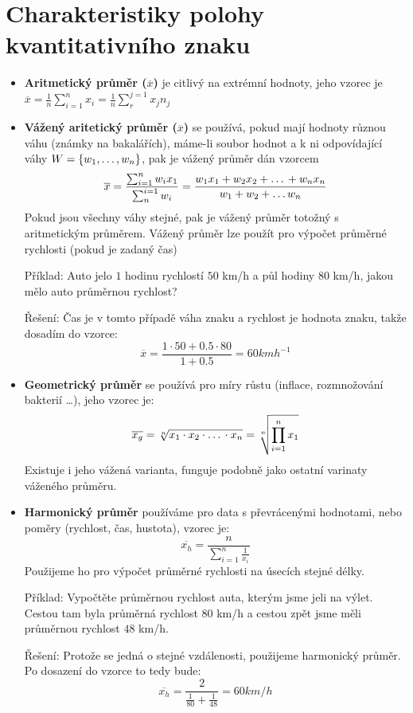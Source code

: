 \documentclass[12pt]{article}
\begin{document}
\section*{Charakteristiky polohy kvantitativního znaku}
\begin{itemize}[itemsep = 2pt]
    \item \textbf{Aritmetický průměr ($\overline{x}$)} je citlivý na extrémní hodnoty, jeho vzorec je \\
    $\overline{x} = \frac{1}{n} \sum_{i=1}^{n} x_i = \frac{1}{n} \sum_{r}^{j=1} x_j n_j$
    \item \textbf{Vážený aritetický průměr ($\overline{x}$)} se používá, pokud mají hodnoty různou váhu (známky na bakalářích), máme-li soubor hodnot a k ni odpovídající váhy $W = \{w_1, \text{\dots}, w_n\}$, pak je vážený průměr dán vzorcem \[\overline{x} = \frac{\sum_{i=1}^{n}w_i x_1}{\sum_{n}^{i = 1}w_i} = \frac{w_1 x_1 + w_2 x_2 +\text{\dots}+ w_n x_n}{w_1 + w_2 + \text{\dots} w_n}\]
    Pokud jsou všechny váhy stejné, pak je vážený průměr totožný s aritmetickým průměrem.
    Vážený průměr lze použít pro výpočet průměrné rychlosti (pokud je zadaný čas)

    Příklad: Auto jelo $1$ hodinu rychlostí $50$ km/h a půl hodiny $80$ km/h, jakou mělo auto průměrnou rychlost?

    Řešení: Čas je v tomto případě váha znaku a rychlost je hodnota znaku, takže dosadím do vzorce:
    \[\overline{x} = \frac{1\cdot 50 + 0.5 \cdot 80}{1 + 0.5} = 60 kmh^{-1}\]
    \item \textbf{Geometrický průměr} se používá pro míry růstu (inflace, rozmnožování bakterií \dots), jeho vzorec je: 
    \[\overline{x_g} = \sqrt[n]{x_1 \cdot x_2 \cdot \text{\dots} \cdot x_n} = \sqrt[n]{\prod_{i=1}^{n}x_1}\]
    Existuje i jeho vážená varianta, funguje podobně jako ostatní varinaty váženého průměru.
    \item \textbf{Harmonický průměr} používáme pro data s převrácenými hodnotami, nebo poměry (rychlost, čas, hustota), vzorec je:
    \[\overline{x_h} = \frac{n}{\sum_{i=1}^{n}\frac{1}{x_i}}\]
    Použijeme ho pro výpočet průměrné rychlosti na úsecích stejné délky.
    
    Příklad: Vypočtěte průměrnou rychlost auta, kterým jsme jeli na výlet. Cestou tam byla průměrná rychlost $80$ km/h a cestou zpět jsme měli průměrnou rychlost $48$ km/h.

    Řešení: Protože se jedná o stejné vzdálenosti, použijeme harmonický průměr. Po dosazení do vzorce to tedy bude:
    \[\overline{x_h} = \frac{2}{\frac{1}{80} + \frac{1}{48}} = 60 km/h\]


\end{itemize}
\end{document}
